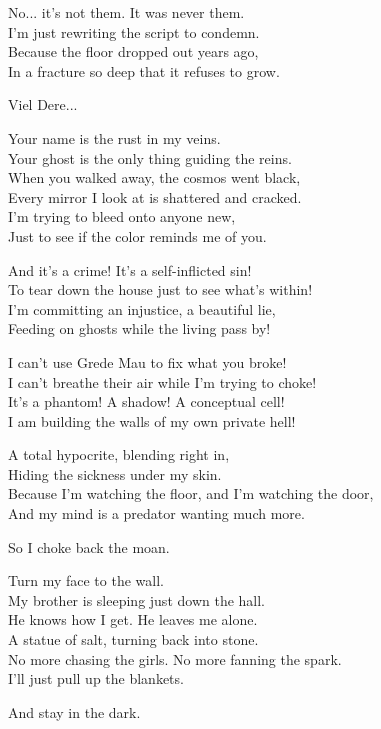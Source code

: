 \begin{lyrics}
No... it’s not them. It was never them.\\
I’m just rewriting the script to condemn.\\
Because the floor dropped out years ago,\\
In a fracture so deep that it refuses to grow.

Viel Dere...

Your name is the rust in my veins.\\
Your ghost is the only thing guiding the reins.\\
When you walked away, the cosmos went black,\\
Every mirror I look at is shattered and cracked.\\
I’m trying to bleed onto anyone new,\\
Just to see if the color reminds me of you.

And it’s a crime! It’s a self-inflicted sin!\\
To tear down the house just to see what’s within!\\
I’m committing an injustice, a beautiful lie,\\
Feeding on ghosts while the living pass by!

I can’t use Grede Mau to fix what you broke!\\
I can’t breathe their air while I’m trying to choke!\\
It’s a phantom! A shadow! A conceptual cell!\\
I am building the walls of my own private hell!

A total hypocrite, blending right in,\\
Hiding the sickness under my skin.\\
Because I’m watching the floor, and I’m watching the door,\\
And my mind is a predator wanting much more.


So I choke back the moan.

Turn my face to the wall.\\
My brother is sleeping just down the hall.\\
He knows how I get. He leaves me alone.\\
A statue of salt, turning back into stone.\\
No more chasing the girls. No more fanning the spark.\\
I’ll just pull up the blankets.

And stay in the dark.
\end{lyrics}
